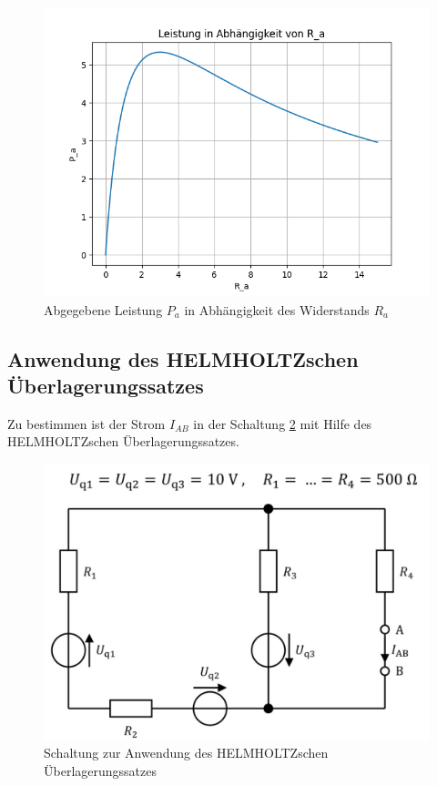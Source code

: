 \begin{figure}
    \centering
    \includegraphics[width=0.8\linewidth]{Bilder/abgegebeneLeistung.png}
    \caption{Abgegebene Leistung $P_a$ in Abhängigkeit des Widerstands $R_a$}
    \label{fig:abgegebeneLeistung}
\end{figure}

\subsection{Anwendung des HELMHOLTZschen Überlagerungssatzes}\label{sec:helmholtz}

Zu bestimmen ist der Strom $I_{AB}$ in der Schaltung \ref{fig:helmholtzSchaltung} mit Hilfe des HELMHOLTZschen Überlagerungssatzes.

\begin{figure}[ht]
    \centering
    \includegraphics[width=0.5\linewidth]{Bilder/Helmholtz.png}
    \caption{Schaltung zur Anwendung des HELMHOLTZschen Überlagerungssatzes}
    \label{fig:helmholtzSchaltung}
\end{figure}

